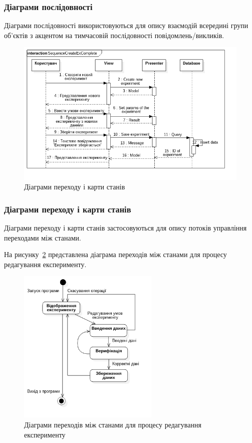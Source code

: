 \subsubsection{Діаграми послідовності}
Діаграми послідовності використовуються для опису взаємодій всередині групи об'єктів з акцентом на тимчасовій послідовності повідомлень/викликів.

\begin{figure}[H]
  \centering
    \includegraphics[width=1\textwidth]{uml_sequence_experiment}
  \caption{Діаграми переходу і карти станів}
  \label{fig:uml_sequence_experiment}
\end{figure}

\subsubsection{Діаграми переходу і карти станів}
Діаграми переходу і карти станів застосовуються для опису потоків управління переходами між станами.

На рисунку~\ref{fig:uml_statechart_experiment_edit} представлена діаграма переходів між станами для процесу редагування експерименту.

\begin{figure}[H]
  \centering
    \includegraphics[width=0.6\textwidth]{uml_statechart_experiment_edit}
  \caption{Діаграми переходів між станами для процесу редагування експерименту}
  \label{fig:uml_statechart_experiment_edit}
\end{figure}

